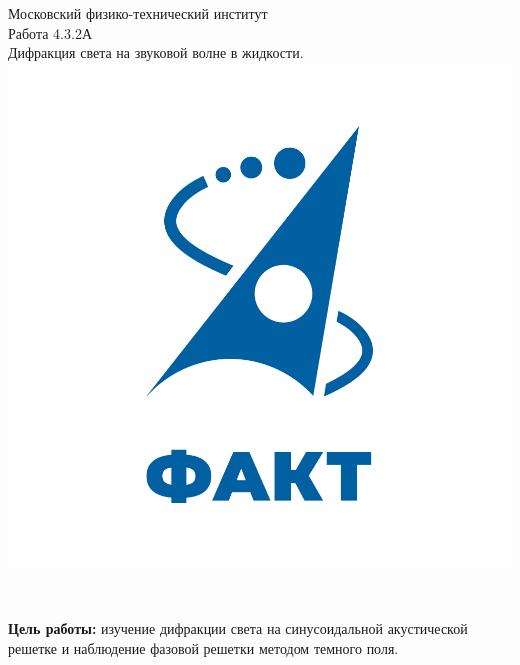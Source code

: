 \documentclass[a4paper,12pt]{article} %
\begin{document}

\begin{titlepage}
\begin{center}
	\large{Московский физико-технический институт}\\
	\vspace{100px}
	\LARGE{Работа 4.3.2А}\\
	\LARGE{Дифракция света на звуковой волне в жидкости.}\\
	\vspace{30px}
	\includegraphics[scale = 0.3]{fakt_logo.png}\\
\end{center}

\vfill
\begin{flushright}
	\\
\end{flushright}
\end{titlepage}

\newpage

\tableofcontents

\newpage



	\textbf{Цель работы:} изучение дифракции света на синусоидальной акустической решетке и наблюдение фазовой решетки методом темного поля.
	
\end{document}
